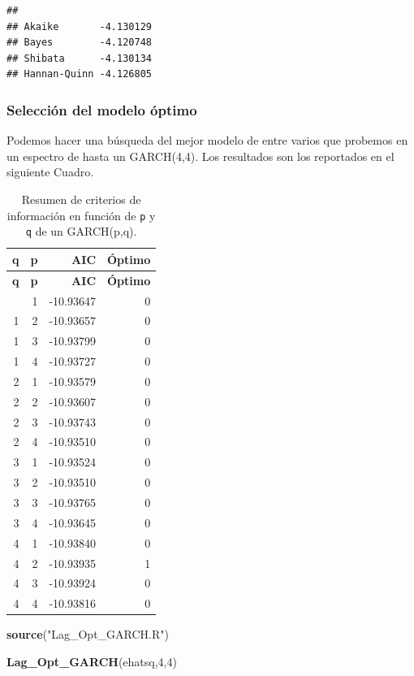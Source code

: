 \documentclass[
]{book}
\newenvironment{Shaded}{\begin{snugshade}}{\end{snugshade}}
\newcommand{\DecValTok}[1]{\textcolor[rgb]{0.00,0.00,0.81}{#1}}
\newcommand{\FunctionTok}[1]{\textcolor[rgb]{0.13,0.29,0.53}{\textbf{#1}}}
\newcommand{\NormalTok}[1]{#1}
\newcommand{\StringTok}[1]{\textcolor[rgb]{0.31,0.60,0.02}{#1}}
\begin{document}
\begin{verbatim}
##                       
## Akaike       -4.130129
## Bayes        -4.120748
## Shibata      -4.130134
## Hannan-Quinn -4.126805
\end{verbatim}

\hypertarget{selecciuxf3n-del-modelo-uxf3ptimo}{%
\subsubsection{Selección del modelo óptimo}\label{selecciuxf3n-del-modelo-uxf3ptimo}}

Podemos hacer una búsqueda del mejor modelo de entre varios que probemos en un espectro de hasta un GARCH(4,4). Los resultados son los reportados en el siguiente Cuadro.

\begin{longtable}[]{@{}rrrr@{}}
\caption{\label{tab:criterios} Resumen de criterios de información en función de \texttt{p} y \texttt{q} de un GARCH(p,q).}\tabularnewline
\toprule\noalign{}
\textbf{q} & \textbf{p} & \textbf{AIC} & \textbf{Óptimo} \\
\midrule\noalign{}
\endfirsthead
\toprule\noalign{}
\textbf{q} & \textbf{p} & \textbf{AIC} & \textbf{Óptimo} \\
\midrule\noalign{}
\endhead
\bottomrule\noalign{}
\endlastfoot
1 & 1 & -10.93647 & 0 \\
1 & 2 & -10.93657 & 0 \\
1 & 3 & -10.93799 & 0 \\
1 & 4 & -10.93727 & 0 \\
2 & 1 & -10.93579 & 0 \\
2 & 2 & -10.93607 & 0 \\
2 & 3 & -10.93743 & 0 \\
2 & 4 & -10.93510 & 0 \\
3 & 1 & -10.93524 & 0 \\
3 & 2 & -10.93510 & 0 \\
3 & 3 & -10.93765 & 0 \\
3 & 4 & -10.93645 & 0 \\
4 & 1 & -10.93840 & 0 \\
4 & 2 & -10.93935 & 1 \\
4 & 3 & -10.93924 & 0 \\
4 & 4 & -10.93816 & 0 \\
\end{longtable}

\begin{Shaded}
\begin{Highlighting}[]
\FunctionTok{source}\NormalTok{(}\StringTok{"Lag\_Opt\_GARCH.R"}\NormalTok{)}

\FunctionTok{Lag\_Opt\_GARCH}\NormalTok{(ehatsq,}\DecValTok{4}\NormalTok{,}\DecValTok{4}\NormalTok{)}
\end{Highlighting}
\end{Shaded}
\end{document}
